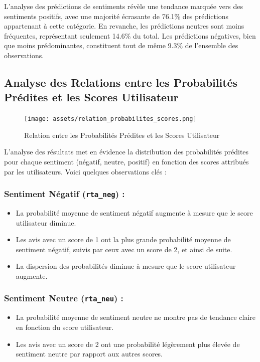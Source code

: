 L'analyse des prédictions de sentiments révèle une tendance marquée vers des sentiments positifs, avec une majorité écrasante de 76.1\% des prédictions appartenant à cette catégorie. En revanche, les prédictions neutres sont moins fréquentes, représentant seulement 14.6\% du total. Les prédictions négatives, bien que moins prédominantes, constituent tout de même 9.3\% de l'ensemble des observations.


\subsection{Analyse des Relations entre les Probabilités Prédites et les Scores Utilisateur}

\begin{figure}[h]
    \centering
    \texttt{[image: assets/relation\_probabilites\_scores.png]}
    \caption{Relation entre les Probabilités Prédites et les Scores Utilisateur}
    \label{fig:relation_probabilites_scores}
\end{figure}

L'analyse des résultats met en évidence la distribution des probabilités prédites pour chaque sentiment (négatif, neutre, positif) en fonction des scores attribués par les utilisateurs. Voici quelques observations clés :

\subsubsection{Sentiment Négatif (\texttt{rta\_neg}) :}

\begin{itemize}
    \item La probabilité moyenne de sentiment négatif augmente à mesure que le score utilisateur diminue.
    \item Les avis avec un score de 1 ont la plus grande probabilité moyenne de sentiment négatif, suivis par ceux avec un score de 2, et ainsi de suite.
    \item La dispersion des probabilités diminue à mesure que le score utilisateur augmente.
\end{itemize}

\subsubsection{Sentiment Neutre (\texttt{rta\_neu}) :}

\begin{itemize}
    \item La probabilité moyenne de sentiment neutre ne montre pas de tendance claire en fonction du score utilisateur.
    \item Les avis avec un score de 2 ont une probabilité légèrement plus élevée de sentiment neutre par rapport aux autres scores.
\end{itemize}

